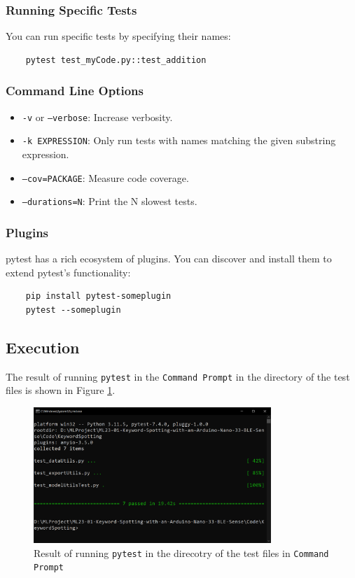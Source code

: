 \subsubsection{Running Specific Tests}

You can run specific tests by specifying their names:

\begin{verbatim}
	pytest test_myCode.py::test_addition
\end{verbatim}


\subsubsection{Command Line Options}

\begin{itemize}
	\item \texttt{-v} or \texttt{--verbose}: Increase verbosity.
	\item \texttt{-k EXPRESSION}: Only run tests with names matching the given substring expression.
	\item \texttt{--cov=PACKAGE}: Measure code coverage.
	\item \texttt{--durations=N}: Print the N slowest tests.
\end{itemize}

\subsubsection{Plugins}

pytest has a rich ecosystem of plugins. You can discover and install them to extend pytest's functionality:

\begin{verbatim}
	pip install pytest-someplugin
	pytest --someplugin
\end{verbatim}


\subsection{Execution}

The result of running \texttt{pytest} in the \texttt{Command Prompt} in the directory of the test files is shown in Figure \ref{fig:pytestResult}.

\begin{figure}[h!]
	\centering
	\includegraphics[width=0.8\textwidth]{Images/testSoftware/pytestResult}
	\caption{Result of running \texttt{pytest} in the direcotry of the test files in \texttt{Command Prompt}} 
	\label{fig:pytestResult}
\end{figure}


